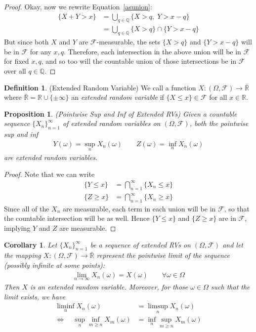 \documentclass[12pt]{article}
\theoremstyle{plain}
\newtheorem{prop}[thm]{Proposition}
\newtheorem{cor}[thm]{Corollary}
\theoremstyle{definition}
\newtheorem{defn}[thm]{Definition}
\theoremstyle{remark}
\newcommand{\limn}{\lim_{n\rightarrow\infty}}
\newcommand{\ra}{\rightarrow}
\newcommand{\sF}{\mathscr{F}}
\newcommand{\Q}{\mathbb{Q}}
\newcommand{\R}{\mathbb{R}}
\newcommand{\ninf}{_{n=1}^\infty}
\begin{document}
\begin{proof}
Okay, now we rewrite Equation~\ref{asunion}:
\begin{align*}
  \{X+Y> x\}
  &=
  \bigcup_{q\in \Q}
  \{
    X > q,\;
    Y > x-q
  \} \\
  &=
  \bigcup_{q\in \Q}
  \{ X > q\}
  \cap
  \{ Y > x-q \}
\end{align*}
But since both $X$ and $Y$ are $\sF$-measurable, the sets $\{X>q\}$ and
$\{Y>x-q\}$ will be in $\sF$ for any $x,q$. Therefore, each intersection
in the above union will be in $\sF$ for fixed $x,q$, and so too will the
countable union of those intersections be in $\sF$ over all $q\in\Q$.
\end{proof}

\begin{defn}(Extended Random Variable)
We call a function $X:(\Omega,\sF)\ra \bar{\R}$ where $\bar{\R}=\R \cup
\{\pm \infty\}$ an \emph{extended random variable} if
$\{X\leq x\}\in\sF$ for all $x\in\R$.
\end{defn}

\begin{prop}\emph{(Pointwise Sup and Inf of Extended RVs)}
Given a countable sequence $\{X_n\}\ninf$ of extended random variables
on $(\Omega,\sF)$, both the pointwise sup and inf
\begin{align*}
  Y(\omega) = \sup_n X_n(\omega)
  \qquad
  Z(\omega) = \inf_n X_n(\omega)
\end{align*}
are extended random variables.
\end{prop}
\begin{proof}
Note that we can write
\begin{align*}
  \{Y \leq x \}
  &= \bigcap\ninf \{X_n\leq x\} \\
  \{Z \geq x \}
  &= \bigcap\ninf \{X_n\geq x\}
\end{align*}
Since all of the $X_n$ are measurable, each term in each union will be
in $\sF$, so that the countable intersection will be as well.
Hence $\{Y\leq x\}$ and $\{Z\geq x\}$ are in $\sF$, implying $Y$ and $Z$
are measurable.
\end{proof}

\begin{cor}
Let $\{X_n\}\ninf$ be a sequence of extended RVs on $(\Omega,\sF)$ and
let the mapping $X:(\Omega,\sF)\ra \bar{\R}$ represent the pointwise
limit of the sequence (possibly infinite at some points):
\begin{align*}
  \limn X_n(\omega) = X(\omega)
  \qquad \forall \omega\in\Omega
\end{align*}
Then $X$ is an extended random variable. Moreover, for those
$\omega\in\Omega$ such that the limit exists, we have
\begin{align*}
  \liminf_n X_n(\omega)
  &=
  \limsup_n X_n(\omega) \\
  \iff\quad
  \sup_n \inf_{m \geq n} X_m(\omega)
  &=
  \inf_n \sup_{m \geq n}
  X_m(\omega)
\end{align*}
\end{cor}
\end{document}
